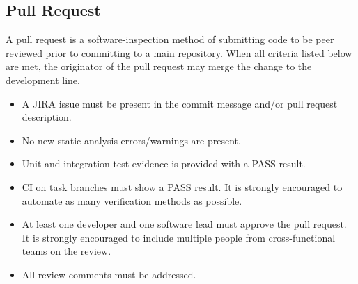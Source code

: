 \subsection{Pull Request}
A pull request is a \gls{software-inspection} method of submitting code to be
peer reviewed prior to committing to a main repository. When all criteria listed
below are met, the originator of the pull request may merge the change to the
development line.

\begin{itemize}
    \item A JIRA issue must be present in the commit message and/or pull request
    description.
    \item No new \gls{static-analysis} errors/warnings are present.
    \item Unit and integration test evidence is provided with a PASS result.
    \item CI on task branches must show a PASS result. It is strongly encouraged
      to automate as many verification methods as possible.
    \item At least one developer and one software lead must approve the pull
    request. It is strongly encouraged to include multiple people from
    cross-functional teams on the review.
    \item All review comments must be addressed.
\end{itemize}

